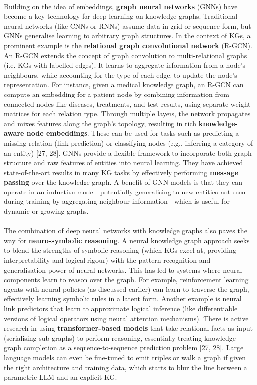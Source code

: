         \paragraph{} Building on the idea of embeddings, \textbf{graph neural networks} (GNNs) have become a key technology for deep learning on knowledge graphs. Traditional neural networks (like CNNs or RNNs) assume data in grid or sequence form, but GNNs generalise learning to arbitrary graph structures. In the context of KGs, a prominent example is the \textbf{relational graph convolutional network} (R-GCN). An R-GCN extends the concept of graph convolution to multi-relational graphs (i.e. KGs with labelled edges). It learns to aggregate information from a node’s neighbours, while accounting for the type of each edge, to update the node’s representation. For instance, given a medical knowledge graph, an R-GCN can compute an embedding for a patient node by combining information from connected nodes like diseases, treatments, and test results, using separate weight matrices for each relation type. Through multiple layers, the network propagates and mixes features along the graph’s topology, resulting in rich \textbf{knowledge-aware node embeddings}. These can be used for tasks such as predicting a missing relation (link prediction) or classifying nodes (e.g., inferring a category of an entity) [27, 28]. GNNs provide a flexible framework to incorporate both graph structure and raw features of entities into neural learning. They have achieved state-of-the-art results in many KG tasks by effectively performing \textbf{message passing} over the knowledge graph. A benefit of GNN models is that they can operate in an inductive mode - potentially generalising to new entities not seen during training by aggregating neighbour information - which is useful for dynamic or growing graphs.

        \newpage
        \paragraph{} The combination of deep neural networks with knowledge graphs also paves the way for \textbf{neuro-symbolic reasoning}. A neural knowledge graph approach seeks to blend the strengths of symbolic reasoning (which KGs excel at, providing interpretability and logical rigour) with the pattern recognition and generalisation power of neural networks. This has led to systems where neural components learn to reason over the graph. For example, reinforcement learning agents with neural policies (as discussed earlier) can learn to traverse the graph, effectively learning symbolic rules in a latent form. Another example is neural link predictors that learn to approximate logical inference (like differentiable versions of logical operators using neural attention mechanisms). There is active research in using \textbf{transformer-based models} that take relational facts as input (serialising sub-graphs) to perform reasoning, essentially treating knowledge graph completion as a sequence-to-sequence prediction problem [27, 28]. Large language models can even be fine-tuned to emit triples or walk a graph if given the right architecture and training data, which starts to blur the line between a parametric LLM and an explicit KG.
        
